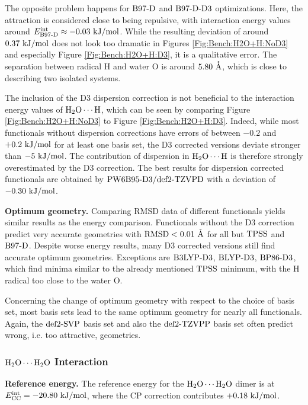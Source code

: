 The opposite problem happens for $\text{B97-D}$ and $\text{B97-D}\text{-D3}$ optimizations. Here, the
attraction is considered close to being repulsive, with interaction energy values around
\mbox{$\eint_{\bns}\approx -0.03\ \kmo$}. While the resulting deviation of around
$0.37\ \text {kJ/mol}$ does not look too dramatic in Figures \ref{Fig:Bench:H2O+H:NoD3} and
especially Figure \ref{Fig:Bench:H2O+H:D3}, it is a qualitative error. The
separation between radical H and water O is around $5.80\ \mathring{\text{A}}$, which is close to describing two isolated
systems.

The inclusion of the D3 dispersion correction is
not beneficial to the interaction energy values of $\mbox{\ensuremath{\text H _2 \text O \cdots \text H}}$, which can be seen
by comparing Figure \ref{Fig:Bench:H2O+H:NoD3} to Figure
\ref{Fig:Bench:H2O+H:D3}. Indeed, while most functionals without dispersion
corrections have errors of between $-0.2$ and $+0.2\ \text {kJ/mol}$ for at least one
basis set, the D3 corrected versions deviate stronger than $-5\ \text {kJ/mol}$.
The contribution of dispersion in $\mbox{\ensuremath{\text H _2 \text O \cdots \text H}}$ is therefore strongly overestimated
by the D3 correction. The best results for dispersion corrected functionals are
obtained by $\text{PW6B95}\text{-D3}/\text{def2-TZVPD}$ with a deviation of $-0.30\ \text {kJ/mol}$.


\textbf{Optimum geometry.} Comparing RMSD data of different functionals yields similar results as the energy comparison.
Functionals without the D3 correction
predict very accurate geometries with \mbox{$\text{RMSD} < 0.01\ \mathring{\text{A}}$} for all but
$\text{TPSS}$ and $\text{B97-D}$.
Despite worse energy results, many D3 corrected versions still find accurate optimum geometries.
Exceptions are $\text{B3LYP}\text{-D3}$, $\text{BLYP}\text{-D3}$, $\text{BP86}\text{-D3}$, which find minima similar
to the already mentioned $\text{TPSS}$ minimum, with the H radical too close to the
water O.

Concerning the change of optimum geometry with respect to the choice of basis
set, most basis sets lead to the same optimum geometry for nearly all
functionals. Again, the \mbox{$\text{def2-SVP}$} basis set and also the $\text{def2-TZVPP}$ basis set
often predict wrong, i.e. too attractive, geometries. 




\subsubsection{$\mbox{\ensuremath{\text H _2 \text O \cdots \text H _2 \text O}}$ Interaction}


\textbf{Reference energy.} The reference energy for the $\mbox{\ensuremath{\text H _2 \text O \cdots \text H _2 \text O}}$ dimer is at
\mbox{$E^{\text{int}}_{\text {CC}}=-20.80\ \text {kJ/mol}$}, where the CP correction contributes $+0.18\ \text {kJ/mol}$.

